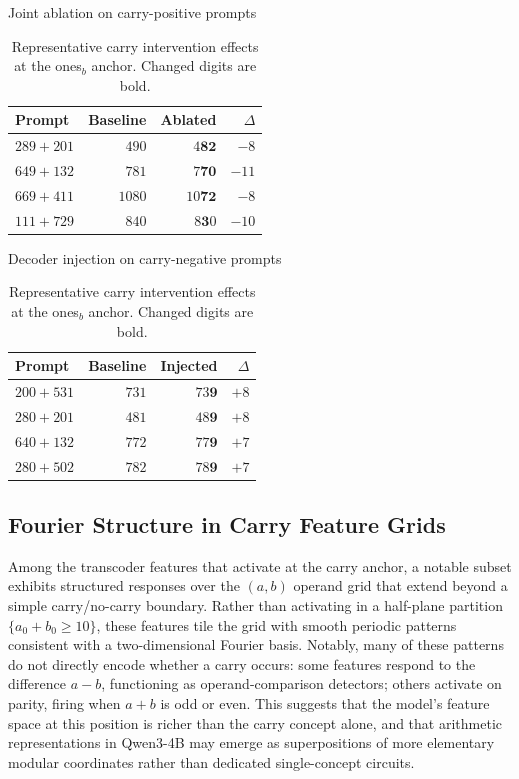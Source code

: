 \begin{table}[ht!]
\centering
\caption{Representative carry intervention effects at the ones$_b$ anchor.
Changed digits are bold.}
\label{tab:carry_intervention}
\begin{minipage}[t]{0.47\textwidth}
  \centering
  \small
  Joint ablation on carry-positive prompts\\[4pt]
  \begin{tabular}{@{}l r r r@{}}
  \toprule
  Prompt & Baseline & Ablated & $\Delta$ \\
  \midrule
  $289{+}201$ & $490$ & $4\mathbf{8}\mathbf{2}$ & $-8$ \\
  $649{+}132$ & $781$ & $7\mathbf{7}\mathbf{0}$ & $-11$ \\
  $669{+}411$ & $1080$ & $10\mathbf{7}\mathbf{2}$ & $-8$ \\
  $111{+}729$ & $840$ & $8\mathbf{3}0$ & $-10$ \\
  \bottomrule
  \end{tabular}
\end{minipage}
\hfill
\begin{minipage}[t]{0.47\textwidth}
  \centering
  \small
  Decoder injection on carry-negative prompts\\[4pt]
  \begin{tabular}{@{}l r r r@{}}
  \toprule
  Prompt & Baseline & Injected & $\Delta$ \\
  \midrule
  $200{+}531$ & $731$ & $73\mathbf{9}$ & $+8$ \\
  $280{+}201$ & $481$ & $48\mathbf{9}$ & $+8$ \\
  $640{+}132$ & $772$ & $77\mathbf{9}$ & $+7$ \\
  $280{+}502$ & $782$ & $78\mathbf{9}$ & $+7$ \\
  \bottomrule
  \end{tabular}
\end{minipage}
\end{table}

\subsection{Fourier Structure in Carry Feature Grids}
\label{sec:fourier_patterns}

Among the transcoder features that activate at the carry anchor, a notable subset exhibits
structured responses over the \((a, b)\) operand grid that extend beyond a simple
carry/no-carry boundary. Rather than activating in a half-plane partition
\(\{a_0 + b_0 \geq 10\}\), these features tile the grid with smooth periodic patterns
consistent with a two-dimensional Fourier basis. Notably, many of these patterns do not
directly encode whether a carry occurs: some features respond to the difference
\(a - b\), functioning as operand-comparison detectors; others activate on parity,
firing when \(a + b\) is odd or even. This suggests that the model's feature space at this
position is richer than the carry concept alone, and that arithmetic representations in
Qwen3-4B may emerge as superpositions of more elementary modular coordinates rather than
dedicated single-concept circuits.


